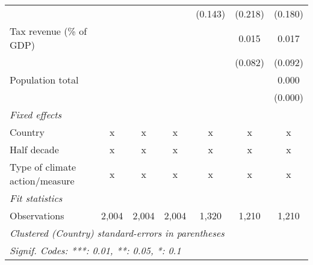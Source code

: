 \begin{tabular}{lcccccc}
                                                           &         &         &               & (0.143)      & (0.218)       & (0.180)\\   
   Tax revenue (\% of GDP)                                 &         &         &               &              & 0.015         & 0.017\\   
                                                           &         &         &               &              & (0.082)       & (0.092)\\   
   Population total                                        &         &         &               &              &               & 0.000\\   
                                                           &         &         &               &              &               & (0.000)\\   
   \emph{Fixed effects}\\
   Country                                                 & x       & x       & x             & x            & x             & x\\  
   Half decade                                             & x       & x       & x             & x            & x             & x\\  
   Type of climate action/measure                          & x       & x       & x             & x            & x             & x\\  
   \midrule \emph{Fit statistics}\\
   Observations                                            & 2,004   & 2,004   & 2,004         & 1,320        & 1,210         & 1,210\\  
   \midrule
   \multicolumn{7}{l}{\emph{Clustered (Country) standard-errors in parentheses}}\\
   \multicolumn{7}{l}{\emph{Signif. Codes: ***: 0.01, **: 0.05, *: 0.1}}\\
\end{tabular}
\par\endgroup


